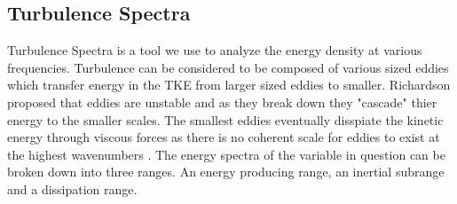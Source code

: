 \documentclass[]{article}
\begin{document}
\subsection{Turbulence Spectra}
Turbulence Spectra is a tool we use to analyze the energy density at various frequencies. Turbulence can be considered to be composed of various sized eddies which transfer energy in the TKE from larger sized eddies to smaller. Richardson proposed that eddies are unstable and as they break down they "cascade" thier energy to the smaller scales. The smallest eddies eventually disspiate the kinetic energy through viscous forces as there is no coherent scale for eddies to exist at the highest wavenumbers \citep{Pope}. The energy spectra of the variable in question can be broken down into three ranges. An energy producing range, an inertial subrange and a dissipation range. 
\end{document}
